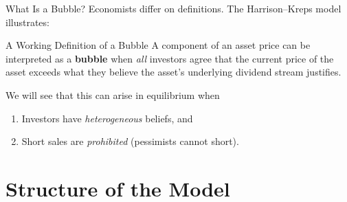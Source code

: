 \documentclass[aspectratio=169]{beamer}
\begin{document}
\begin{frame}{What Is a Bubble?}
  Economists differ on definitions. The Harrison--Kreps model illustrates:

  \bigskip
  \begin{alertblock}{A Working Definition of a Bubble}
    A component of an asset price can be interpreted as a \textbf{bubble} when
    \emph{all} investors agree that the current price of the asset exceeds what
    they believe the asset's underlying dividend stream justifies.
  \end{alertblock}

  \bigskip
  We will see that this can arise in equilibrium when
  \begin{enumerate}
    \item Investors have \emph{heterogeneous} beliefs, and
    \item Short sales are \emph{prohibited} (pessimists cannot short).
  \end{enumerate}
\end{frame}

\section{Structure of the Model}
\end{document}
